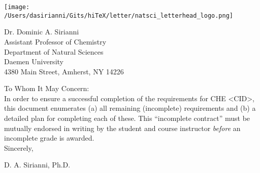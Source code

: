 

\pagestyle{fancy}
\date{\today}

\begin{center}
\texttt{[image: /Users/dasirianni/Gits/hiTeX/letter/natsci\_letterhead\_logo.png]}
\end{center}
{\noindent Dr. Dominic A. Sirianni\\
Assistant Professor of Chemistry\\
Department of Natural Sciences\\
Daemen University\\
4380 Main Street, Amherst, NY 14226\\

\date{\today}
}

\thispagestyle{empty}


\noindent To Whom It May Concern:\\

In order to ensure a successful completion of the requirements for CHE <CID>,
this document enumerates (a) all remaining (incomplete) requirements and (b) a
detailed plan for completing each of these.  This ``incomplete contract'' must
be mutually endorsed in writing by the student and course instructor {\em before}
an incomplete grade is awarded.\\


\noindent Sincerely,

\vspace{2 cm}

\noindent D. A. Sirianni, Ph.D.



